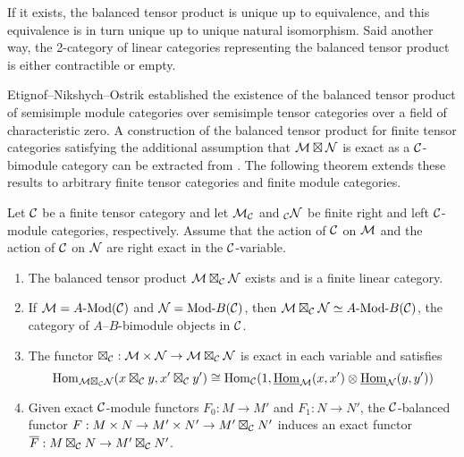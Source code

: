 \documentclass{amsart}
\begin{document}
If it exists, the balanced tensor product is unique up to equivalence, and this equivalence is in turn unique up to unique natural isomorphism. Said another way, the 2-category of linear categories representing the balanced tensor product is either contractible or empty. 

Etignof--Nikshych--Ostrik \cite{0909.3140} established the existence of the balanced tensor product of semisimple module categories over semisimple tensor categories over a field of characteristic zero.  A construction of the balanced tensor product for finite tensor categories satisfying the additional assumption that $\mathcal M \boxtimes \mathcal N$ is exact as a $\mathcal C$-bimodule category can be extracted from \cite[Thm 3.1]{1102.3411}.
 The following theorem extends these results to arbitrary finite tensor categories and finite module categories. 

\begin{theorem} \label{thm:DelignePrdtOverATCExists}
	Let $\mathcal C$ be a finite tensor category and let $\mathcal M_{\mathcal C}$ and ${}_{\mathcal C}\mathcal N$ be finite right and left $\mathcal C$-module categories, respectively. Assume that the action of $\mathcal C$ on $\mathcal M$ and the action of $\mathcal C$ on $\mathcal N$ are right exact in the $\mathcal C$-variable.
	\begin{enumerate}
		\item The balanced tensor product $\mathcal M \boxtimes_{\mathcal C} \mathcal N$ exists and is a finite linear category.
		\item If $\cM = \Mod{A}{}(\cC)$ and $\cN = \Mod{}{B}(\cC)$, then $\cM \boxtimes_{\cC} \cN \simeq \Mod{A }{B}(\cC)$, the category of $A$--$B$-bimodule objects in $\mathcal C$.
		\item The functor $\boxtimes_{\mathcal C}: \mathcal M \times \mathcal N \to \mathcal M \boxtimes_{\mathcal C} \mathcal N$ is exact in each variable and satisfies 
		\begin{equation*}
			 \operatorname{Hom}_{\mathcal M \boxtimes_{\mathcal C} \mathcal N} (x \boxtimes_{\mathcal C} y, x' \boxtimes_{\mathcal C} y') \cong \operatorname{Hom}_{\mathcal C}(1, \operatorname{\underline{Hom}}_{\mathcal M}(x,x') \otimes \operatorname{\underline{Hom}}_{\mathcal N}(y, y'))
		\end{equation*}
		\item Given exact $\mathcal C$-module functors $F_0: M \to M'$ and $F_1: N \to N'$, the $\mathcal C$-balanced functor $F: M \times N \to M' \times N' \to M' \boxtimes_{\mathcal C} N'$ induces an exact functor $\overline{F}: M \boxtimes_{\mathcal C} N \to M' \boxtimes_{\mathcal C} N'$.
	\end{enumerate} 
\end{theorem}
\end{document}
